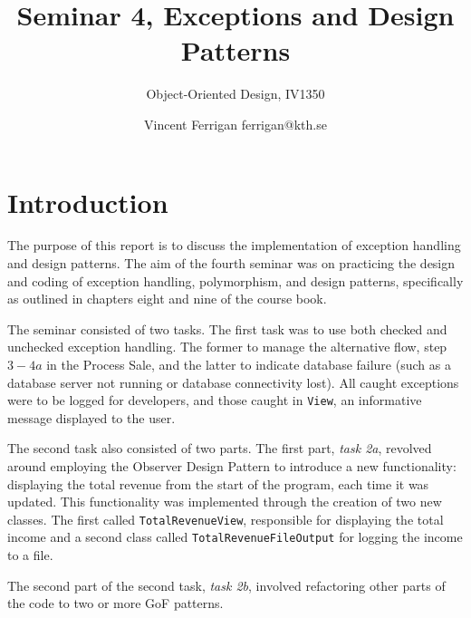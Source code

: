 \documentclass[a4paper]{scrreprt}
\title{Seminar 4, Exceptions and Design Patterns}
\subtitle{Object-Oriented Design, IV1350}
\author{Vincent Ferrigan ferrigan@kth.se}
\begin{document}
\maketitle

\tableofcontents %

\chapter{Introduction}
The purpose of this report is to discuss the implementation of exception handling
and design patterns.
The aim of the fourth seminar was on practicing the design
and coding of exception handling, polymorphism, and design patterns,
specifically as outlined in chapters eight and nine of the course book.

The seminar consisted of two tasks.
The first task was to use both checked and
unchecked exception handling.
The former to manage the alternative flow, step $3-4a$
in the Process Sale, and the latter to indicate database failure (such as a
database server not running or database connectivity lost).
All caught exceptions were to be logged for developers, and those caught
in \verb|View|, an informative message displayed to the user.

The second task also consisted of two parts.
The first part, \emph{task 2a}, revolved
around employing the Observer Design Pattern to introduce a new functionality:
displaying the total revenue from the start of the program, each time it was
updated.
This functionality was implemented through the creation of two new
classes.
The first called \texttt{TotalRevenueView}, responsible for displaying the
total income and a second class called \texttt{TotalRevenueFileOutput} for logging the
income to a file.

The second part of the second task, \emph{task 2b}, involved refactoring other parts of
the code to two or more GoF patterns.

\end{document}
